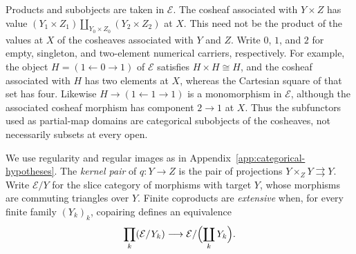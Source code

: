 Products and subobjects are taken in $\mathcal E$. The cosheaf
associated with $Y\times Z$ has value
$(Y_1\times Z_1)\amalg_{Y_0\times Z_0}(Y_2\times Z_2)$ at $X$.
This need not be the product of the values at $X$ of
the cosheaves associated with $Y$ and $Z$. Write $0$, $1$, and $2$
for empty, singleton, and two-element numerical carriers, respectively.
For example,
the object $H=(1\leftarrow0\to1)$ of $\mathcal E$ satisfies
$H\times H\cong H$,
and the cosheaf associated with $H$ has two elements at $X$,
whereas the Cartesian square of that set has four.
Likewise $H\to(1\leftarrow1\to1)$ is a monomorphism in $\mathcal E$,
although the associated cosheaf morphism has component $2\to1$ at $X$.
Thus the subfunctors used as partial-map domains are categorical subobjects
of the cosheaves, not necessarily subsets at every open.

We use regularity and regular images as in
Appendix~\ref{app:categorical-hypotheses}. The \emph{kernel
pair} of $q:Y\to Z$ is the pair of projections
$Y\times_ZY\rightrightarrows Y$.
Write $\mathcal E/Y$ for the slice category of morphisms with target $Y$,
whose morphisms are commuting triangles over $Y$.
Finite coproducts are \emph{extensive} when, for every finite family
$(Y_k)_k$, copairing defines an equivalence
\[
 \prod_k(\mathcal E/Y_k)\longrightarrow
 \mathcal E/\Bigl(\coprod_kY_k\Bigr).
\]

